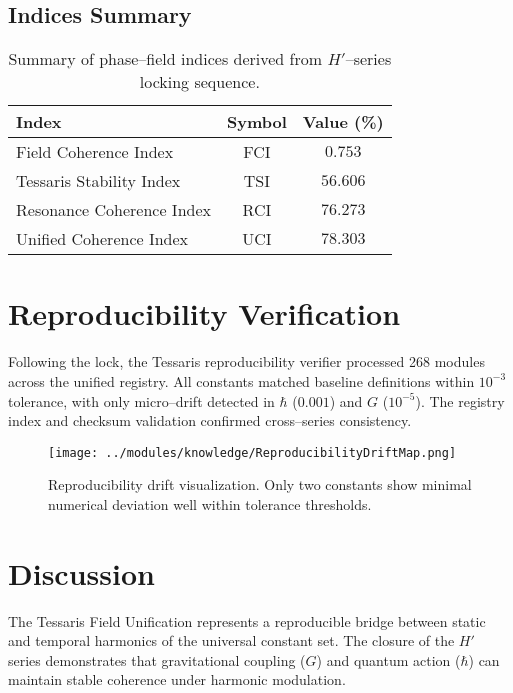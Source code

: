 \documentclass[preprint,onecolumn,aps,prd,longbibliography,nofootinbib]{revtex4-2}
\begin{document}
\subsection{Indices Summary}
\begin{table}[h!]
\centering
\begin{tabular}{lcc}
\toprule
Index & Symbol & Value (\%) \\
\midrule
Field Coherence Index & FCI & $0.753$ \\
Tessaris Stability Index & TSI & $56.606$ \\
Resonance Coherence Index & RCI & $76.273$ \\
Unified Coherence Index & UCI & $78.303$ \\
\bottomrule
\end{tabular}
\caption{Summary of phase--field indices derived from $H'$--series locking sequence.}
\end{table}

\section{Reproducibility Verification}
Following the lock, the Tessaris reproducibility verifier processed 268 modules across the unified registry. All constants matched baseline definitions within $10^{-3}$ tolerance, with only micro--drift detected in $\hbar$ ($0.001$) and $G$ ($10^{-5}$). The registry index and checksum validation confirmed cross--series consistency.

\begin{figure}[h!]
    \centering
    \texttt{[image: ../modules/knowledge/ReproducibilityDriftMap.png]}
    \caption{Reproducibility drift visualization. Only two constants show minimal numerical deviation well within tolerance thresholds.}
\end{figure}

\section{Discussion}
The Tessaris Field Unification represents a reproducible bridge between static and temporal harmonics of the universal constant set. The closure of the $H'$ series demonstrates that gravitational coupling ($G$) and quantum action ($\hbar$) can maintain stable coherence under harmonic modulation.
\end{document}
